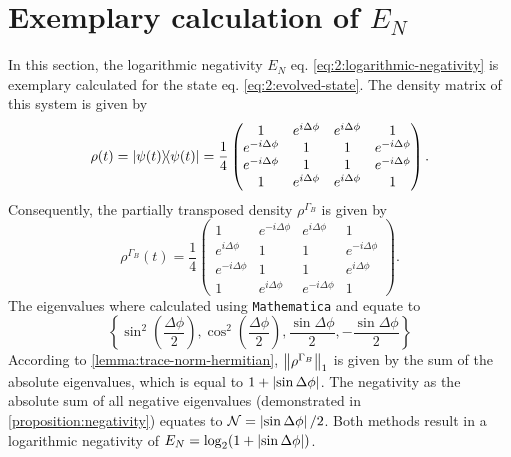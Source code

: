 \section{Exemplary calculation of $E_N$}
\label{apx:E_N-exemplary}
In this section, the logarithmic negativity $E_N$ eq. \eqref{eq:2:logarithmic-negativity} is exemplary calculated for the state eq. \eqref{eq:2:evolved-state}.
The density matrix of this system is given by
\begin{equation}
  \rho(t) = \ketbra{\psi(t)} = \frac{1}{4}
  \begin{pmatrix}
    1 & e^{i\Delta\phi}  & e^{i\Delta\phi} & 1 \\
    e^{-i\Delta\phi} & 1 & 1  & e^{-i\Delta\phi} \\
    e^{-i\Delta\phi} & 1  & 1 & e^{-i\Delta\phi} \\
    1 & e^{i\Delta\phi} & e^{i\Delta\phi} & 1
  \end{pmatrix}.
\end{equation}
Consequently, the partially transposed density $\rho^{\Gamma_B}$ is given by
\begin{equation}
  \rho^{\Gamma_B}(t) = \frac{1}{4}
  \begin{pmatrix}
    1 & e^{-i\Delta\phi}  & e^{i\Delta\phi} & 1 \\
    e^{i\Delta\phi} & 1 & 1  & e^{-i\Delta\phi} \\
    e^{-i\Delta\phi} & 1  & 1 & e^{i\Delta\phi} \\
    1 & e^{i\Delta\phi} & e^{-i\Delta\phi} & 1
  \end{pmatrix}.
\end{equation}
The eigenvalues where calculated using \texttt{Mathematica} and equate to
\begin{equation*}
  \left\{ \sin^2\left(\frac{\Delta\phi}{2}\right), \cos^2\left(\frac{\Delta\phi}{2}\right), \frac{\sin\Delta\phi}{2}, -\frac{\sin\Delta\phi}{2} \right\}
\end{equation*}
According to \cref{lemma:trace-norm-hermitian}, $\left\lVert\rho^{\Gamma_B}\right\rVert_1$ is given by the sum of the absolute eigenvalues, which is equal to $1+\left\lvert\sin\Delta\phi\right\rvert$. The negativity as the absolute sum of all negative eigenvalues (demonstrated in \cref{proposition:negativity}) equates to $\mathcal{N} = \left\lvert\sin\Delta\phi\right\rvert/2$. Both methods result in a logarithmic negativity of $E_N = \log_2(1 + \left\lvert\sin\Delta\phi\right\rvert)$.